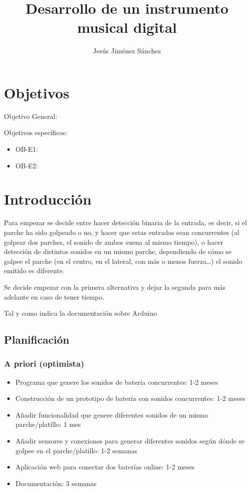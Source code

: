 \documentclass{article}
\title{Desarrollo de un instrumento musical digital}
\author{ Jesús Jiménez Sánchez }
\begin{document}
\maketitle

\section*{Objetivos}
Objetivo General: 

Objetivos específicos:
\begin{itemize}
    \item OB-E1:
    \item OB-E2:
\end{itemize}

\section{Introducción}
Para empezar se decide entre hacer detección binaria de la entrada, es decir, si el parche ha sido golpeado o no, y hacer que estas entradas sean concurrentes (al golpear dos parches, el sonido de ambos suena al mismo tiempo), o hacer detección de distintos sonidos en un mismo parche, dependiendo de cómo se golpee el parche (en el centro, en el lateral, con más o menos fuerza…) el sonido emitido es diferente.

Se decide empezar con la primera alternativa y dejar la segunda para más adelante en caso de tener tiempo.

Tal y como indica la documentación sobre Arduino \cite{DocArduino}

\subsection{Planificación}

 \subsubsection{A priori (optimista)}
 
 \begin{itemize}
    \item Programa que genere los sonidos de batería concurrentes: 1-2 meses
    \item Construcción de un prototipo de batería con sonidos concurrentes: 1-2 meses
    \item Añadir funcionalidad que genere diferentes sonidos de un mismo parche/platillo: 1 mes
    \item Añadir sensores y conexiones para generar diferentes sonidos según dónde se golpee en el parche/platillo: 1-2 semanas
    \item Aplicación web para conectar dos baterías online: 1-2 meses
    \item Documentación: 3 semanas
\end{itemize}
\end{document}
